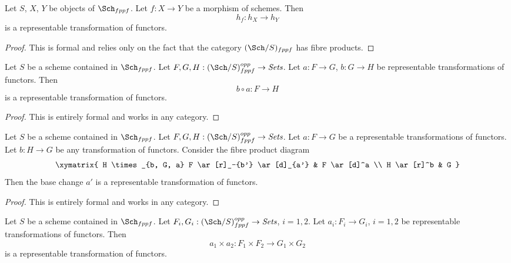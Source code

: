\begin{lemma}
\label{lemma-morphism-schemes-gives-representable-transformation}
Let $S$, $X$, $Y$ be objects of $\Sch_{fppf}$.
Let $f : X \to Y$ be a morphism of schemes.
Then
$$
h_f : h_X \longrightarrow h_Y
$$
is a representable transformation of functors.
\end{lemma}

\begin{proof}
This is formal and relies only on the fact that
the category $(\Sch/S)_{fppf}$ has fibre products.
\end{proof}

\begin{lemma}
\label{lemma-composition-representable-transformations}
Let $S$ be a scheme contained in $\Sch_{fppf}$.
Let $F, G, H : (\Sch/S)_{fppf}^{opp} \to \textit{Sets}$.
Let $a : F \to G$, $b : G \to H$ be representable transformations of functors.
Then
$$
b \circ a : F \longrightarrow H
$$
is a representable transformation of functors.
\end{lemma}

\begin{proof}
This is entirely formal and works in any category.
\end{proof}

\begin{lemma}
\label{lemma-base-change-representable-transformations}
Let $S$ be a scheme contained in $\Sch_{fppf}$.
Let $F, G, H : (\Sch/S)_{fppf}^{opp} \to \textit{Sets}$.
Let $a : F \to G$ be a representable transformations of functors.
Let $b : H \to G$ be any transformation of functors.
Consider the fibre product diagram
$$
\xymatrix{
H \times_{b, G, a} F \ar[r]_-{b'} \ar[d]_{a'} & F \ar[d]^a \\
H \ar[r]^b & G
}
$$
Then the base change $a'$ is a representable transformation of functors.
\end{lemma}

\begin{proof}
This is entirely formal and works in any category.
\end{proof}

\begin{lemma}
\label{lemma-product-representable-transformations}
Let $S$ be a scheme contained in $\Sch_{fppf}$.
Let $F_i, G_i : (\Sch/S)_{fppf}^{opp} \to \textit{Sets}$, $i = 1, 2$.
Let $a_i : F_i \to G_i$, $i = 1, 2$
be representable transformations of functors.
Then
$$
a_1 \times a_2 : F_1 \times F_2 \longrightarrow G_1 \times G_2
$$
is a representable transformation of functors.
\end{lemma}

